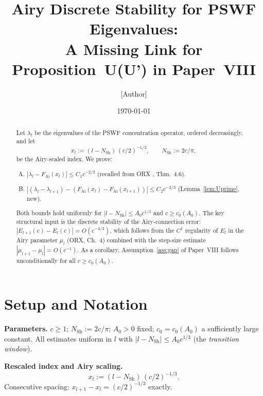 \documentclass[12pt]{amsart}
\newcommand{\FAi}{F_{\mathrm{Ai}}}
\newcommand{\NSh}{N_{\mathrm{Sh}}}
\begin{document}

\title[Airy Discrete Stability for PSWF Eigenvalues]{
  Airy Discrete Stability for PSWF Eigenvalues:\\
  A Missing Link for Proposition~U(U') in Paper~VIII}

\author{[Author]}
\date{\today}
\maketitle

\begin{abstract}
Let $\lambda_l$ be the eigenvalues of the PSWF concentration
operator, ordered decreasingly, and let
\[
  x_l := (l - \NSh)\,(c/2)^{-1/3}, \qquad \NSh := 2c/\pi,
\]
be the Airy-scaled index.
We prove:
\begin{enumerate}[(U)]
  \item $|\lambda_l - \FAi(x_l)| \le C_1 c^{-2/3}$ \quad
        (recalled from ORX \cite{OsipovRokhlinXiao}, Thm.~4.6).
  \item $|(\lambda_l - \lambda_{l+1})
          - (\FAi(x_l) - \FAi(x_{l+1}))|  \le C_2 c^{-2/3}$
        \quad (Lemma~\ref{lem:Uprime}, new).
\end{enumerate}
Both bounds hold uniformly for $|l - \NSh| \le A_0 c^{1/3}$
and $c \ge c_0(A_0)$.
The key structural input is the discrete stability of the
Airy-connection error: $|E_{l+1}(c) - E_l(c)| = O(c^{-4/3})$,
which follows from the $C^1$ regularity of $E_l$ in the Airy
parameter $\mu_l$ (ORX, Ch.~4) combined with the step-size
estimate $|\mu_{l+1} - \mu_l| = O(c^{-1})$.
As a corollary, Assumption~\ref{ass:gap} of Paper~VIII
\cite{paperVIII} follows unconditionally for all
$c \ge c_0(A_0)$.
\end{abstract}

\section{Setup and Notation}
\label{sec:setup}

\noindent\textbf{Parameters.}
$c \ge 1$; $\NSh := 2c/\pi$; $A_0 > 0$ fixed;
$c_0 = c_0(A_0)$ a sufficiently large constant.
All estimates uniform in $l$ with $|l - \NSh| \le A_0 c^{1/3}$
(the \emph{transition window}).

\medskip
\noindent\textbf{Rescaled index and Airy scaling.}
\begin{equation}\label{eq:xl}
  x_l := (l - \NSh)\,(c/2)^{-1/3}.
\end{equation}
Consecutive spacing: $x_{l+1} - x_l = (c/2)^{-1/3}$ exactly.
\end{document}
